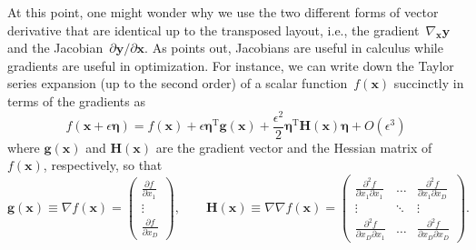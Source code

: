\documentclass[12pt,a4paper]{article}
\begin{document}
At this point,
one might wonder why we use the two different forms of vector derivative that are identical
up to the transposed layout, i.e.,
the gradient~$\nabla_{\mathbf{x}} \mathbf{y}$ and
the Jacobian~$\partial\mathbf{y}/\partial\mathbf{x}$.
As \citet{Minka:OldNewMatrixAlgebra} points out,
Jacobians are useful in calculus while gradients are useful in optimization.
For instance, we can write down the Taylor series expansion
(up to the second order) of a scalar function~$f(\mathbf{x})$ succinctly
in terms of the gradients as
\begin{equation}
f(\mathbf{x} + \epsilon\bm{\eta}) =
f(\mathbf{x})
+ \epsilon\bm{\eta}^{\operatorname{T}} \mathbf{g}(\mathbf{x})
+ \frac{\epsilon^2}{2} {\bm{\eta}}^{\operatorname{T}} \mathbf{H}(\mathbf{x}) \bm{\eta}
+ O \left( \epsilon^3 \right)
\end{equation}
where $\mathbf{g}(\mathbf{x})$ and $\mathbf{H}(\mathbf{x})$ are
the gradient vector and the Hessian matrix of $f(\mathbf{x})$, respectively, so that
\begin{equation}
\mathbf{g}(\mathbf{x}) \equiv \nabla f(\mathbf{x}) =
\begin{pmatrix}
\frac{\partial f}{\partial x_{1}} \\
\vdots \\
\frac{\partial f}{\partial x_{D}}
\end{pmatrix} , \qquad
\mathbf{H}(\mathbf{x}) \equiv \nabla\nabla f(\mathbf{x}) =
\begin{pmatrix}
\frac{\partial^{2} f}{\partial x_{1} \partial x_{1}} &
\hdots &
\frac{\partial^{2} f}{\partial x_{1} \partial x_{D}} \\
\vdots & \ddots & \vdots \\
\frac{\partial^{2} f}{\partial x_{D} \partial x_{1}} &
\hdots &
\frac{\partial^{2} f}{\partial x_{D} \partial x_{D}}
\end{pmatrix} .
\end{equation}
\end{document}
